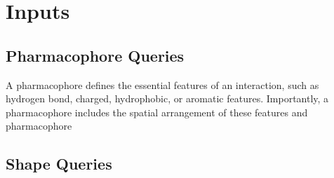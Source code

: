 \section{Inputs}

\subsection{Pharmacophore Queries}
A pharmacophore \cite{Koes_2015rev,Yang_2010,Leach_2010} defines the essential features of an interaction, such as hydrogen bond, charged, hydrophobic, or aromatic features. Importantly, a pharmacophore includes the spatial arrangement of these features and pharmacophore

\subsection{Shape Queries}

\cite{matchpack}\cite{vams}